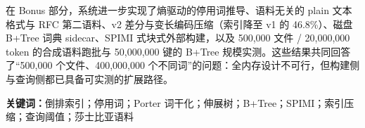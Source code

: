 \documentclass[UTF8,a4paper,12pt]{ctexrep}
\begin{document}
在 Bonus 部分，系统进一步实现了熵驱动的停用词推导、语料无关的 plain 文本格式与 RFC 第二语料、v2 差分与变长编码压缩（索引降至 v1 的 46.8\%）、磁盘 B+Tree 词典 sidecar、SPIMI 式块式外部构建，以及 500,000 文件 / 20,000,000 token 的合成语料跑批与 50,000,000 键的 B+Tree 规模实测。这些结果共同回答了“500,000 个文件、400,000,000 个不同词”的问题：全内存设计不可行，但构建侧与查询侧都已具备可实测的扩展路径。

\medskip
\noindent\textbf{关键词：}倒排索引；停用词；Porter 词干化；伸展树；B+Tree；SPIMI；索引压缩；查询阈值；莎士比亚语料
\endgroup

\tableofcontents
\clearpage
{}






\end{document}
